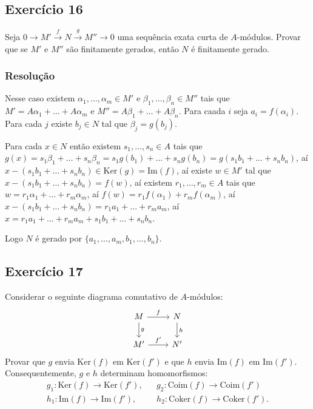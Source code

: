 \documentclass[10pt,a4paper]{article}
\begin{document}
\subsection*{Exercício 16}

Seja $0\rightarrow M'\xrightarrow{f}N\xrightarrow{g}M''\rightarrow0$ uma sequência exata curta de $A$-módulos. Provar que se $M'$ e $M''$ são finitamente gerados, então $N$ é finitamente gerado.

\subsubsection*{Resolução}

Nesse caso existem $\alpha_1,\dots,\alpha_m\in M'$ e $\beta_1,\dots,\beta_n\in M''$ tais que $M'=A\alpha_1+\dots+A\alpha_m$ e $M''=A\beta_1+\dots+A\beta_n$. Para caada $i$ seja $a_i=f(\alpha_i)$. Para cada $j$ existe $b_j\in N$ tal que $\beta_j=g(b_j)$.

\medskip
\noindent
Para cada $x\in N$ então existem $s_1,\dots,s_n\in A$ tais que $g(x)=s_1\beta_1+\dots+s_n\beta_n=s_1g(b_1)+\dots+s_ng(b_n)=g(s_1b_1+\dots+s_nb_n)$, aí $x-(s_1b_1+\dots+s_nb_n)\in\mathrm{Ker}(g)=\mathrm{Im}(f)$, aí existe $w\in M'$ tal que $x-(s_1b_1+\dots+s_nb_n)=f(w)$, aí existem $r_1,\dots,r_m\in A$ tais que $w=r_1\alpha_1+\dots+r_m\alpha_m$, aí $f(w)=r_1f(\alpha_1)+r_mf(\alpha_m)$, aí $x-(s_1b_1+\dots+s_nb_n)=r_1a_1+\dots+r_ma_m$, aí $x=r_1a_1+\dots+r_ma_m+s_1b_1+\dots+s_nb_n$.

\medskip
\noindent
Logo $N$ é gerado por $\{a_1,\dots,a_m,b_1,\dots,b_n\}$.

\subsection*{Exercício 17}

Considerar o seguinte diagrama comutativo de $A$-módulos:
\[
\begin{tikzcd}
M \arrow{r}{f} \arrow{d}{g} & N \arrow{d}{h} \\
M' \arrow{r}{f'} & N'
\end{tikzcd}
\]
Provar que $g$ envia $\mathrm{Ker}(f)$ em $\mathrm{Ker}(f')$ e que $h$ envia $\mathrm{Im}(f)$ em $\mathrm{Im}(f')$. Consequentemente, $g$ e $h$ determinam homomorfismos:
\[
\begin{array}{lcl}
g_1:\mathrm{Ker}(f)\rightarrow\mathrm{Ker}(f'),&&g_2:\mathrm{Coim}(f)\rightarrow\mathrm{Coim}(f')\\h_1:\mathrm{Im}(f)\rightarrow\mathrm{Im}(f'),&&h_2:\mathrm{Coker}(f)\rightarrow\mathrm{Coker}(f').
\end{array}
\]
\end{document}

